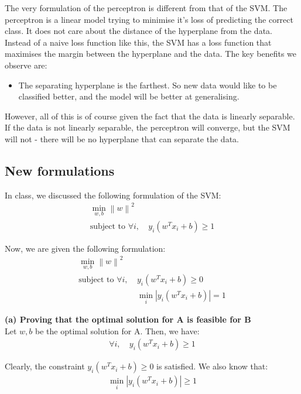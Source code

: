 \documentclass[a4paper]{article}
\newcommand{\norm}[1]{\left\lVert#1\right\rVert}
\begin{document}
The very formulation of the perceptron is different from that of the SVM. The perceptron is a linear model trying to minimise it's loss of predicting the correct class. It does not care about the distance of the hyperplane from the data.\\

Instead of a naive loss function like this, the SVM has a loss function that maximises the margin between the hyperplane and the data. The key benefits we observe are:
\begin{itemize}
    \item The separating hyperplane is the farthest. So new data would like to be classified better, and the model will be better at generalising.
\end{itemize}

However, all of this is of course given the fact that the data is linearly separable. If the data is not linearly separable, the perceptron will converge, but the SVM will not - there will be no hyperplane that can separate the data.


\newpage

\subsection{New formulations}

In class, we discussed the following formulation of the SVM:
\begin{align*}
    \min_{w, b} \norm{w}^2&\\
    \text{subject to } \forall i, \ &y_i(w^T x_i + b) \geq 1
\end{align*}

Now, we are given the following formulation:
\begin{align*}
    \min_{w, b} \norm{w}^2&\\
    \text{subject to } \forall i, \ &y_i(w^T x_i + b) \geq 0\\
    &\min_i | y_i(w^T x_i + b) | = 1
\end{align*}

\textbf{(a) Proving that the optimal solution for A is feasible for B}\\

Let $w, b$ be the optimal solution for A. Then, we have:
\begin{align*}
    \forall i, \ &y_i(w^T x_i + b) \geq 1
\end{align*}

Clearly, the constraint $y_i (w^T x_i + b) \geq 0$ is satisfied. We also know that:
\begin{align*}
    \min_i | y_i(w^T x_i + b) | \geq 1
\end{align*}
\end{document}
